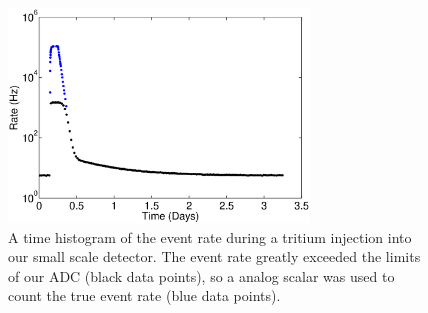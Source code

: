 \begin{figure}[h!]\centering
\includegraphics[width=80mm]{fig/TimeHisto_Analog2.eps}
\caption{A time histogram of the event rate during a tritium injection into our small scale detector. The event rate greatly exceeded the limits of our ADC (black data points), so a analog scalar was used to count the true event rate (blue data points). }
\label{fig:Density}
\end{figure}

